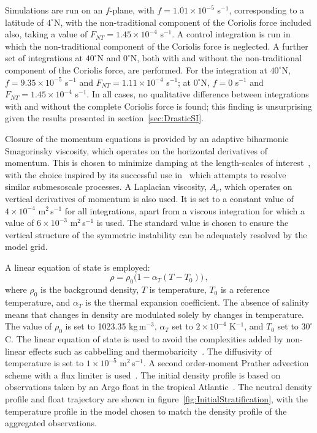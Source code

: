 Simulations are run on an $f$-plane, with $f = 1.01 \times 10 ^{-5}$ s$^{-1}$, corresponding to a latitude of $4^\circ$N, with the non-traditional component of the Coriolis force included also, taking a value of $F_{NT} = 1.45 \times 10^{-4}$ s$^{-1}$. A control integration is run in which the non-traditional component of the Coriolis force is neglected. A further set of integrations at $40^\circ$N and $0^\circ$N, both with and without the non-traditional component of the Coriolis force, are performed. For the integration at $40^\circ$N, $f = 9.35 \times 10^{-5} $ s$^{-1}$ and $F_{NT} = 1.11 \times 10^{-4}$ s$^{-1}$; at $0^\circ$N, $f = 0$ s$^{-1}$ and $F_{NT} = 1.45 \times 10^{-4}$ s$^{-1}$. In all cases, no qualitative difference between integrations with and without the complete Coriolis force is found; this finding is unsurprising given the results presented in section~\ref{sec:DrasticSI}.

Closure of the momentum equations is provided by an adaptive biharmonic Smagorinsky viscosity, which operates on the horizontal derivatives of momentum. This is chosen to minimize damping at the length-scales of interest~\citep{Smagorinsky1963, Griffies2000}, with the choice inspired by its successful use in~\citet{Brannigan2016} which attempts to resolve similar submesoscale processes. A Laplacian viscosity, $A_r$, which operates on vertical derivatives of momentum is also used. It is set to a constant value of $4 \times 10^{-4}$ m$^2$\,s$^{-1}$ for all integrations, apart from a viscous integration for which a value of $6 \times 10^{-3}$ m$^2$\,s$^{-1}$ is used. The standard value is chosen to ensure the vertical structure of the symmetric instability can be adequately resolved by the model grid.

A linear equation of state is employed:
\begin{equation}
    \rho = \rho_{0} \big(1 - \alpha_T (T - T_0 )\big) \, ,
    \label{eq:EOS}
\end{equation}
where $\rho_{0}$ is the background density, $T$ is temperature, $T_0$ is a reference temperature, and $\alpha_T$ is the thermal expansion coefficient. The absence of salinity means that changes in density are modulated solely by changes in temperature. The value of $\rho_{0}$ is set to 1023.35 kg$\,$m$^{-3}$, $\alpha_T$  set to $2 \times 10^{-4}$ K$^{-1}$, and $T_0$ set to $30^{\circ}$C. The linear equation of state is used to avoid the complexities added by non-linear effects such as cabbelling and thermobaricity~\citep[e.g.][]{Groeskamp2016}. The diffusivity of temperature is set to $1 \times 10^{-5}$ m$^2$\,s$^{-1}$. A second order-moment Prather advection scheme with a flux limiter is used~\citep{Prather1986}. The initial density profile is based on observations taken by an Argo float in the tropical Atlantic~\citep{Argo2019}. The neutral density profile and float trajectory are shown in figure~\ref{fig:InitialStratification}, with the temperature profile in the model chosen to match the density profile of the aggregated observations.

